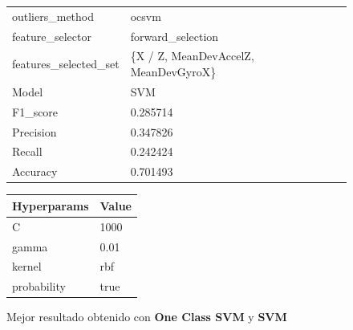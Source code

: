 \begin{appendices}
		\begin{figure}[htb]
			\centering
			\begin{tabular}{ll}
				\toprule
					  outliers\_method &                                ocsvm \\
					 feature\_selector &                    forward\_selection \\
				features\_selected\_set & \{X / Z, MeanDevAccelZ, MeanDevGyroX\} \\
								Model &                                  SVM \\
						F1\_score &                             0.285714 \\
					   Precision &                             0.347826 \\
						  Recall &                             0.242424 \\
						Accuracy &                             0.701493 \\
				\bottomrule
			\end{tabular}
			\newline
			\newline

			\begin{tabular}{ll}
				\toprule
				Hyperparams & Value \\
				\midrule
						  C &  1000 \\
					  gamma &  0.01 \\
					 kernel &   rbf \\
				probability &  true \\
				\bottomrule
			\end{tabular}
			\caption{Mejor resultado obtenido con \textbf{One Class SVM} y \textbf{SVM}}
			\label{table:25}
		\end{figure}


\end{appendices}
